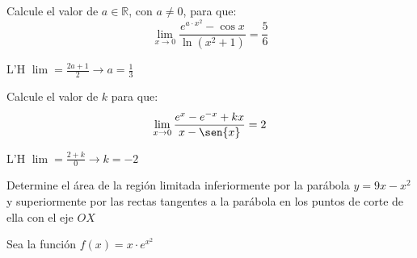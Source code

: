 \documentclass[addpoints,spanish, 12pt,a4paper]{exam}
\begin{document}
\begin{questions}
\question[2] Calcule el valor de $a \in \mathbb{R}$, con $a\neq 0$, para que: $$\lim_{x \to 0}\dfrac{e^{a\cdot x^2}-\cos{x}}{\ln\left({x^2+1}\right)}=\frac{5}{6}$$
\begin{solution}
    L'H $\lim = \frac{2a+1}{2} \to a = \frac{1}{3}$
\end{solution}

\question[2] Calcule el valor de $k$ para que: $$\lim_{x \to 0}\dfrac{e^x-e^{-x}+kx}{x-\sen{x}}=2$$
\begin{solution}
    L'H $\lim =\frac{2+k}{0}  \to k = -2$
\end{solution}
\addpoints

\question[2] Determine el área de la región limitada inferiormente por la parábola $y=9x-x^2$ y superiormente por las rectas tangentes a la parábola en los puntos de corte de ella con el eje $OX$

\question Sea la función $f(x)=x\cdot e^{x^2}$
\addpoints



\end{questions}
\end{document}
